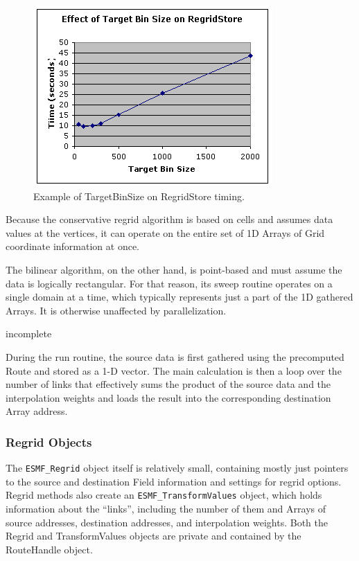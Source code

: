 \begin{center}
\begin{figure}
\caption{Example of TargetBinSize on RegridStore timing. }
\label{fig:TargetBinSize}
\includegraphics{TargetBinSize.tif}
\end{figure}
\end{center}

Because the conservative regrid algorithm is based on cells and assumes data
values at the vertices, it can operate on the entire set of 1D Arrays of Grid
coordinate information at once.

The bilinear algorithm, on the other hand, is point-based and must assume the
data is logically rectangular.  For that reason, its sweep routine operates on
a single domain at a time, which typically represents just a part of the 1D
gathered Arrays.  It is otherwise unaffected by parallelization.


incomplete


During the run routine, the source data is first gathered using the
precomputed Route and stored as a 1-D vector.  The main calculation is then 
a loop over the number of links that effectively sums the product of the
source data and the interpolation weights and loads the result into the
corresponding destination Array address.

\subsubsection{Regrid Objects}
The {\tt ESMF\_Regrid} object itself is relatively small, containing mostly
just pointers to the source and destination Field information and settings
for regrid options.  Regrid methods also create an {\tt ESMF\_TransformValues}
object, which holds information about the ``links'', including the number of
them and Arrays of source addresses, destination addresses, and interpolation
weights.  Both the Regrid and TransformValues objects are private and 
contained by the RouteHandle object.

